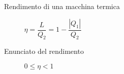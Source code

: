 \documentclass[a4paper,11pt,italian]{article}
\begin{document}
\begin{description}
%   
%   
%    

  \item[Rendimento di una macchina termica]
  $ \eta = \dfrac{L}{Q_2} = 1 - \dfrac{|Q_1|}{Q_2} $
  
  \item[Enunciato del rendimento] 
  $ 0 \leq \eta < 1 $
  
%   
  


\end{description}
\end{document}
